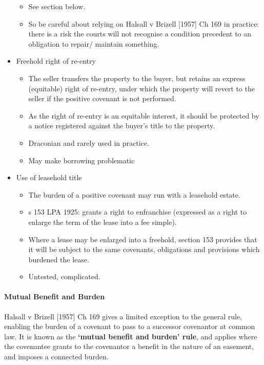 \documentclass[
]{article}
\providecommand{\tightlist}{%
  \setlength{\itemsep}{0pt}\setlength{\parskip}{0pt}}
\begin{document}
\begin{itemize}
  \begin{itemize}
  \tightlist
  \item
    See section below.
  \item
    So be careful about relying on Halsall v Brizell {[}1957{]} Ch 169
    in practice: there is a risk the courts will not recognise a
    condition precedent to an obligation to repair/ maintain something.
  \end{itemize}
\item
  Freehold right of re-entry

  \begin{itemize}
  \tightlist
  \item
    The seller transfers the property to the buyer, but retains an
    express (equitable) right of re-entry, under which the property will
    revert to the seller if the positive covenant is not performed.
  \item
    As the right of re-entry is an equitable interest, it should be
    protected by a notice registered against the buyer's title to the
    property.
  \item
    Draconian and rarely used in practice.
  \item
    May make borrowing problematic
  \end{itemize}
\item
  Use of leasehold title

  \begin{itemize}
  \tightlist
  \item
    The burden of a positive covenant may run with a leasehold estate.
  \item
    s 153 LPA 1925: grants a right to enfranchise (expressed as a right
    to enlarge the term of the lease into a fee simple).
  \item
    Where a lease may be enlarged into a freehold, section 153 provides
    that it will be subject to the same covenants, obligations and
    provisions which burdened the lease.
  \item
    Untested, complicated.
  \end{itemize}
\end{itemize}

\hypertarget{mutual-benefit-and-burden}{%
\paragraph{Mutual Benefit and Burden}\label{mutual-benefit-and-burden}}

Halsall v Brizell {[}1957{]} Ch 169 gives a limited exception to the
general rule, enabling the burden of a covenant to pass to a successor
covenantor at common law. It is known as the \textbf{`mutual benefit and
burden' rule}, and applies where the covenantee grants to the covenantor
a benefit in the nature of an easement, and imposes a connected burden.
\end{document}
